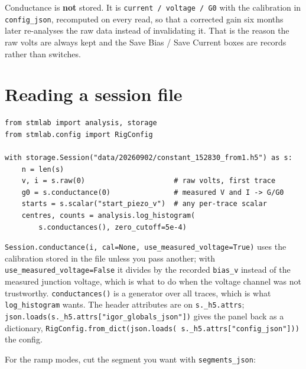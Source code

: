 Conductance is \textbf{not} stored. It is \texttt{current /\discretionary{}{}{} voltage /\discretionary{}{}{} G0} with the calibration in \texttt{config\_\discretionary{}{}{}json}, recomputed on every read, so that a corrected gain six months later re-analyses the raw data instead of invalidating it. That is the reason the raw volts are always kept and the Save Bias / Save Current boxes are records rather than switches.

\section{Reading a session file}

\begin{lstlisting}[style=py]
from stmlab import analysis, storage
from stmlab.config import RigConfig

with storage.Session("data/20260902/constant_152830_from1.h5") as s:
    n = len(s)
    v, i = s.raw(0)                     # raw volts, first trace
    g0 = s.conductance(0)               # measured V and I -> G/G0
    starts = s.scalar("start_piezo_v")  # any per-trace scalar
    centres, counts = analysis.log_histogram(
        s.conductances(), zero_cutoff=5e-4)
\end{lstlisting}

\texttt{Session.\discretionary{}{}{}conductance(i,\discretionary{}{}{} cal=None,\discretionary{}{}{} use\_\discretionary{}{}{}measured\_\discretionary{}{}{}voltage=True)} uses the calibration stored in the file unless you pass another; with \texttt{use\_\discretionary{}{}{}measured\_\discretionary{}{}{}voltage=False} it divides by the recorded \texttt{bias\_\discretionary{}{}{}v} instead of the measured junction voltage, which is what to do when the voltage channel was not trustworthy. \texttt{conductances()} is a generator over all traces, which is what \texttt{log\_\discretionary{}{}{}histogram} wants. The header attributes are on \texttt{s.\discretionary{}{}{}\_\discretionary{}{}{}h5.\discretionary{}{}{}attrs}; \texttt{json.\discretionary{}{}{}loads(s.\discretionary{}{}{}\_\discretionary{}{}{}h5.\discretionary{}{}{}attrs["igor\_\discretionary{}{}{}globals\_\discretionary{}{}{}json"])} gives the panel back as a dictionary, \texttt{Rig\discretionary{}{}{}Config.\discretionary{}{}{}from\_\discretionary{}{}{}dict(json.\discretionary{}{}{}loads( s.\discretionary{}{}{}\_\discretionary{}{}{}h5.\discretionary{}{}{}attrs["config\_\discretionary{}{}{}json"]))} the config.

For the ramp modes, cut the segment you want with \texttt{segments\_\discretionary{}{}{}json}:

